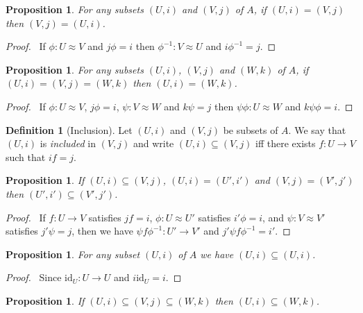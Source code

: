 \documentclass{book}
\let\qed\relax
\newtheorem{prop}[ax]{Proposition}
\theoremstyle{definition}
\newtheorem{df}[ax]{Definition}
\newcommand{\id}[1]{\ensuremath{\mathrm{id}_{#1}}}
\newcommand{\inv}[1]{\ensuremath{{#1}^{-1}}}
\begin{document}
\begin{prop}
For any subsets $(U,i)$ and $(V,j)$ of $A$, if $(U,i) = (V,j)$ then $(V,j) = (U,i)$.
\end{prop}

\begin{proof}
\pf\ If $\phi : U \approx V$ and $j \phi = i$ then $\inv{\phi} : V \approx U$ and $i \inv{\phi} = j$. \qed
\end{proof}

\begin{prop}
For any subsets $(U,i)$, $(V,j)$ and $(W,k)$ of $A$, if $(U,i) = (V,j) = (W,k)$ then $(U,i) = (W,k)$.
\end{prop}

\begin{proof}
\pf\ If $\phi : U \approx V$, $j \phi = i$, $\psi : V \approx W$ and $k \psi = j$ then $\psi \phi : U \approx W$ and $k \psi \phi = i$. \qed
\end{proof}

\begin{df}[Inclusion]
Let $(U,i)$ and $(V,j)$ be subsets of $A$. We say that $(U,i)$ is \emph{included} in $(V,j)$ and write $(U,i) \subseteq (V,j)$ iff there exists $f : U \rightarrow V$ such that $if = j$.
\end{df}

\begin{prop}
If $(U,i) \subseteq (V,j)$, $(U,i) = (U',i')$ and $(V,j) = (V',j')$ then $(U',i') \subseteq (V',j')$.
\end{prop}

\begin{proof}
\pf\ If $f : U \rightarrow V$ satisfies $jf = i$, $\phi : U \approx U'$ satisfies $i' \phi = i$, and $\psi : V \approx V'$ satisfies $j' \psi = j$, then we have $\psi f \inv{\phi} : U' \rightarrow V'$ and $j' \psi f \inv{\phi} = i'$. \qed
\end{proof}

\begin{prop}
For any subset $(U,i)$ of $A$ we have $(U,i) \subseteq (U,i)$.
\end{prop}

\begin{proof}
\pf\ Since $\id{U} : U \rightarrow U$ and $i \id{U} = i$. \qed
\end{proof}

\begin{prop}
If $(U,i) \subseteq (V,j) \subseteq (W,k)$ then $(U,i) \subseteq (W,k)$.
\end{prop}
\end{document}
